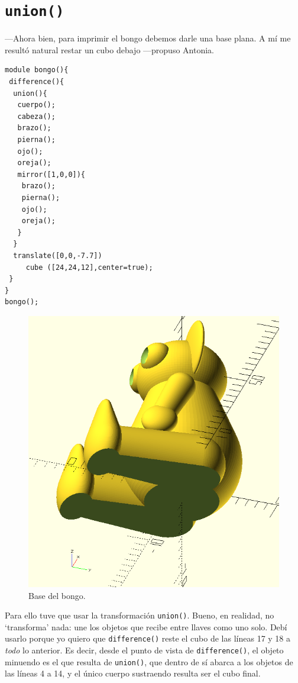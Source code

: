     \section{\texttt{union()}}

  
    ---Ahora bien, para imprimir el bongo debemos darle una base
    plana. A mí me resultó natural restar un cubo debajo
    ---pro\-pu\-so Antonia.

   \begin{lstlisting}
module bongo(){  
 difference(){
  union(){
   cuerpo();
   cabeza();
   brazo();
   pierna();
   ojo();
   oreja();
   mirror([1,0,0]){
    brazo();
    pierna();
    ojo();
    oreja();
   }
  }
  translate([0,0,-7.7])
     cube ([24,24,12],center=true);
 }
}
bongo();
\end{lstlisting}

\begin{figure}[ht]
  \centering
  \includegraphics[width=.55\textwidth]{imagenes/bongo-base}  
  \caption{Base del bongo.}
  \label{fig:bongo-base}
\end{figure}


\guillemotright Para ello tuve que usar la transformación
\lstinline!union()!. Bueno, en realidad, no `transforma' nada: une los
objetos que recibe entre llaves como uno solo. Debí usarlo porque yo
quiero que \lstinline!difference()! reste el cubo de las líneas 17 y
18 a \emph{todo} lo anterior. Es decir, desde el punto de vista de
\lstinline!difference()!, el objeto minuendo es el que resulta de
\lstinline!union()!, que dentro de sí abarca a los objetos de las
líneas 4 a 14, y el único cuerpo sustraendo resulta ser el cubo final.

